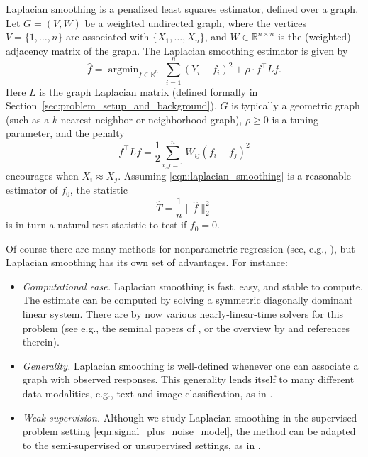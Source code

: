 \documentclass[twoside]{article}
\newcommand{\Reals}{\mathbb{R}}
\newcommand{\1}{\mathbf{1}}
\DeclareMathOperator*{\argmin}{argmin}
\newcommand{\Lap}{L}
\newcommand{\wh}[1]{\widehat{#1}}
\theoremstyle{definition}
\theoremstyle{remark}
\begin{document}
Laplacian smoothing \citep{smola2003} is a penalized least squares estimator, defined over a graph. Let $G = (V,W)$ be a weighted undirected graph, where the vertices $V=\{1,\ldots,n\}$ are associated with $\{X_1,\ldots,X_n\}$, and $W \in \mathbb{R}^{n \times n}$ is the (weighted) adjacency matrix of the graph. The Laplacian smoothing estimator \smash{$\wh{f}$} is given by
\begin{equation}
\label{eqn:laplacian_smoothing}
\wh{f} =  \argmin_{f \in \Reals^n} \; \sum_{i = 1}^{n}(Y_i - f_i)^2 + \rho \cdot f^\top \Lap f. 
\end{equation}
Here $\Lap$ is the graph Laplacian matrix (defined formally in Section~\ref{sec:problem_setup_and_background}), $G$ is typically a geometric graph (such as a $k$-nearest-neighbor or neighborhood graph), $\rho \geq 0$ is a tuning parameter, and the penalty
\begin{equation*}
f^\top \Lap f = \frac{1}{2} \sum_{i,j = 1}^{n} W_{ij}(f_i - f_j)^2
\end{equation*}
encourages \smash{$\wh{f}_i \approx \wh{f}_j$} when $X_i \approx X_j$. Assuming \eqref{eqn:laplacian_smoothing} is a reasonable estimator of $f_0$, the statistic
\begin{equation}
\label{eqn:laplacian_smoothing_test}
\wh{T} = \frac{1}{n} \| \wh{f} \|_2^2 
\end{equation}
is in turn a natural test statistic to test if $f_0 = 0$. 

Of course there are many methods for nonparametric regression (see, e.g., \citet{gyorfi2006,wasserman2006,tsybakov2008_book}), but Laplacian smoothing has its own set of advantages. For instance:
\begin{itemize}
	\item \emph{Computational ease.} Laplacian smoothing is fast, easy, and stable to compute. The estimate \smash{$\wh{f}$} can be computed by solving a symmetric diagonally dominant linear system. There are by now various nearly-linear-time solvers for this problem (see e.g., the seminal papers of \citet{spielman2011,spielman2013,spielman2014}, or the overview by \citet{vishnoi2012} and references therein).
	\item \emph{Generality.} Laplacian smoothing is well-defined whenever one can associate a graph with observed responses. This generality lends itself to many different data modalities, e.g., text and image classification, as in \citet{kondor2002,belkin03a,belkin2006}.
	\item \emph{Weak supervision.} Although we study Laplacian smoothing in the supervised problem setting \eqref{eqn:signal_plus_noise_model}, the method can be adapted to the semi-supervised or unsupervised settings, as in \citet{zhu2003semisupervised,zhou2005learning,nadler09}. %
\end{itemize}
\end{document}
